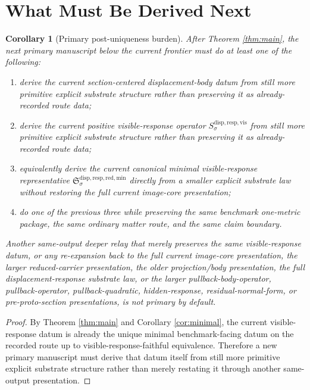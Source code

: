 \documentclass[11pt]{article}
\newcommand{\VisibleResponseOperator}[1]{S_{#1}^{\mathrm{disp,resp,vis}}}
\newcommand{\MinimalReducedStructure}{\mathfrak S^{\mathrm{disp,resp,red,min}}}
\newtheorem{corollary}{Corollary}
\begin{document}
\section{What Must Be Derived Next}

\begin{corollary}[Primary post-uniqueness burden]
\label{cor:next}
After Theorem \ref{thm:main}, the next primary manuscript below the current frontier must do at least one of the following:
\begin{enumerate}
    \item derive the current section-centered displacement-body datum from still more primitive explicit substrate structure rather than preserving it as already-recorded route data;
    \item derive the current positive visible-response operator \(\VisibleResponseOperator{\sigma}\) from still more primitive explicit substrate structure rather than preserving it as already-recorded route data;
    \item equivalently derive the current canonical minimal visible-response representative \(\MinimalReducedStructure_{\sigma}\) directly from a smaller explicit substrate law without restoring the full current image-core presentation;
    \item do one of the previous three while preserving the same benchmark one-metric package, the same ordinary matter route, and the same claim boundary.
\end{enumerate}
Another same-output deeper relay that merely preserves the same visible-response datum, or any re-expansion back to the full current image-core presentation, the larger reduced-carrier presentation, the older projection/body presentation, the full displacement-response substrate law, or the larger pullback-body-operator, pullback-operator, pullback-quadratic, hidden-response, residual-normal-form, or pre-proto-section presentations, is not primary by default.
\end{corollary}

\begin{proof}
By Theorem \ref{thm:main} and Corollary \ref{cor:minimal}, the current visible-response datum is already the unique minimal benchmark-facing datum on the recorded route up to visible-response-faithful equivalence. Therefore a new primary manuscript must derive that datum itself from still more primitive explicit substrate structure rather than merely restating it through another same-output presentation.
\end{proof}
\end{document}
